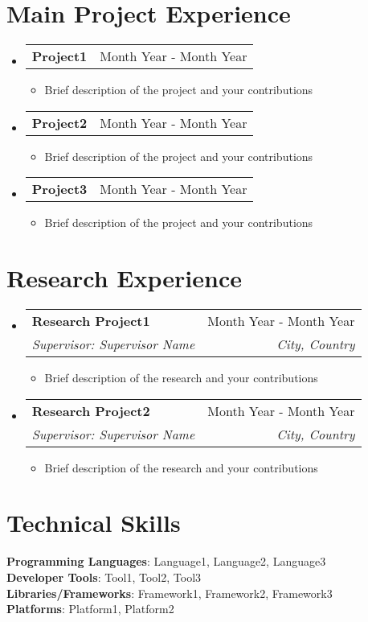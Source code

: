 \documentclass[letterpaper,11pt]{article}
\makeatletter
\newcommand{\resumeItem}[1]{
  \item\small{
    {#1 \vspace{-2pt}}
  }
}
\newcommand{\resumeSubheading}[4]{
  \vspace{-2pt}\item
    \begin{tabular*}{0.97\textwidth}[t]{l@{\extracolsep{\fill}}r}
      \textbf{#1} & #2 \\
      \textit{\small#3} & \textit{\small #4} \\
    \end{tabular*}\vspace{-7pt}
}
\newcommand{\resumeProjectHeading}[2]{
    \item
    \begin{tabular*}{0.97\textwidth}{l@{\extracolsep{\fill}}r}
      \small#1 & #2 \\
    \end{tabular*}\vspace{-7pt}
}
\newcommand{\resumeSubHeadingListStart}{\begin{itemize}[leftmargin=0.15in, label={}]}
\newcommand{\resumeSubHeadingListEnd}{\end{itemize}}
\newcommand{\resumeItemListStart}{\begin{itemize}}
\newcommand{\resumeItemListEnd}{\end{itemize}\vspace{-5pt}}
\makeatother
\begin{document}
\section{Main Project Experience}
  \resumeSubHeadingListStart
    \resumeProjectHeading
      {\textbf{Project1}}{Month Year - Month Year}
      \resumeItemListStart
        \resumeItem{Brief description of the project and your contributions}
      \resumeItemListEnd
    \resumeProjectHeading
      {\textbf{Project2}}{Month Year - Month Year}
      \resumeItemListStart
        \resumeItem{Brief description of the project and your contributions}
      \resumeItemListEnd
    \resumeProjectHeading
      {\textbf{Project3}}{Month Year - Month Year}
      \resumeItemListStart
        \resumeItem{Brief description of the project and your contributions}
      \resumeItemListEnd
  \resumeSubHeadingListEnd

\section{Research Experience}
  \resumeSubHeadingListStart    
    \resumeSubheading
      {Research Project1}{Month Year - Month Year}
      {Supervisor: Supervisor Name}{City, Country}
      \resumeItemListStart
        \resumeItem{Brief description of the research and your contributions}
      \resumeItemListEnd
    \resumeSubheading
      {Research Project2}{Month Year - Month Year}
      {Supervisor: Supervisor Name}{City, Country}
      \resumeItemListStart
        \resumeItem{Brief description of the research and your contributions}
      \resumeItemListEnd
  \resumeSubHeadingListEnd

\section{Technical Skills}
 \begin{itemize}[leftmargin=0.15in, label={}]
    \small{\item{
     \textbf{Programming Languages}{: Language1, Language2, Language3} \\
     \textbf{Developer Tools}{: Tool1, Tool2, Tool3} \\
     \textbf{Libraries/Frameworks}{: Framework1, Framework2, Framework3} \\
     \textbf{Platforms}{: Platform1, Platform2}
    }}
 \end{itemize}
\end{document}
